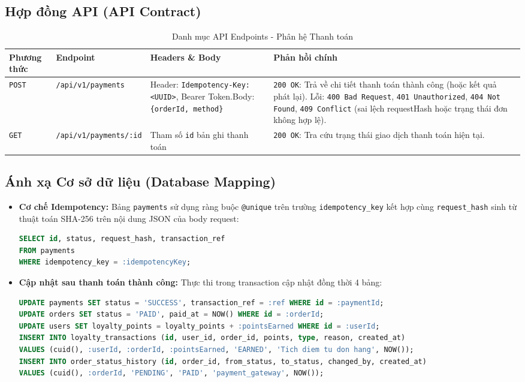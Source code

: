 \clearpage
\subsection{Hợp đồng API (API Contract)}
\begin{table}[H]
\centering
\small
\caption{Danh mục API Endpoints - Phân hệ Thanh toán}
\label{tab:api-payment}
\begin{tabularx}{\textwidth}{llp{4.5cm}X}
\toprule
\textbf{Phương thức} & \textbf{Endpoint} & \textbf{Headers \& Body} & \textbf{Phản hồi chính} \\
\midrule
\texttt{POST} & \texttt{/api/v1/payments} & 
Header: \texttt{Idempotency-Key: <UUID>}, Bearer Token.\newline Body: \texttt{\{orderId, method\}} & 
\texttt{200 OK}: Trả về chi tiết thanh toán thành công (hoặc kết quả phát lại). Lỗi: \texttt{400 Bad Request}, \texttt{401 Unauthorized}, \texttt{404 Not Found}, \texttt{409 Conflict} (sai lệch requestHash hoặc trạng thái đơn không hợp lệ). \\
\texttt{GET} & \texttt{/api/v1/payments/:id} & Tham số \texttt{id} bản ghi thanh toán & 
\texttt{200 OK}: Tra cứu trạng thái giao dịch thanh toán hiện tại. \\
\bottomrule
\end{tabularx}
\end{table}

\subsection{Ánh xạ Cơ sở dữ liệu (Database Mapping)}
\begin{itemize}
    \item \textbf{Cơ chế Idempotency:} Bảng \texttt{payments} sử dụng ràng buộc \texttt{@unique} trên trường \texttt{idempotency\_key} kết hợp cùng \texttt{request\_hash} sinh từ thuật toán SHA-256 trên nội dung JSON của body request:
    \begin{lstlisting}[language=SQL]
SELECT id, status, request_hash, transaction_ref 
FROM payments 
WHERE idempotency_key = :idempotencyKey;
    \end{lstlisting}
    \item \textbf{Cập nhật sau thanh toán thành công:} Thực thi trong transaction cập nhật đồng thời 4 bảng:
    \begin{lstlisting}[language=SQL]
UPDATE payments SET status = 'SUCCESS', transaction_ref = :ref WHERE id = :paymentId;
UPDATE orders SET status = 'PAID', paid_at = NOW() WHERE id = :orderId;
UPDATE users SET loyalty_points = loyalty_points + :pointsEarned WHERE id = :userId;
INSERT INTO loyalty_transactions (id, user_id, order_id, points, type, reason, created_at)
VALUES (cuid(), :userId, :orderId, :pointsEarned, 'EARNED', 'Tich diem tu don hang', NOW());
INSERT INTO order_status_history (id, order_id, from_status, to_status, changed_by, created_at)
VALUES (cuid(), :orderId, 'PENDING', 'PAID', 'payment_gateway', NOW());
    \end{lstlisting}
\end{itemize}

